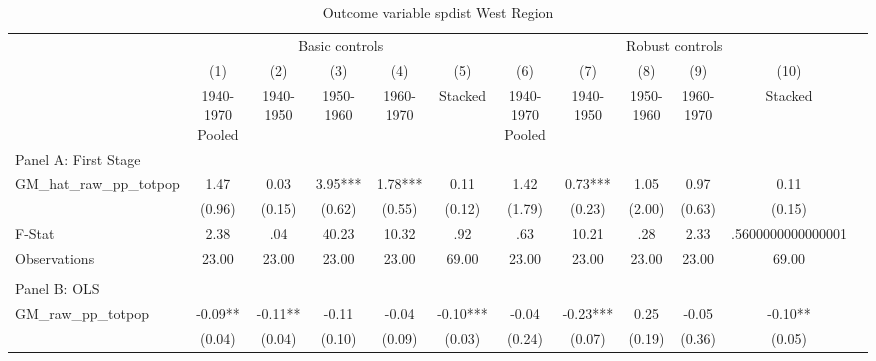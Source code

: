  \begin{table}[htbp]\centering {} \begin{threeparttable} \caption{Outcome variable spdist West Region} \begin{tabular}{l*{11}{c}} \toprule
          &\multicolumn{5}{c}{Basic controls}                                   &\multicolumn{5}{c}{Robust controls}                                  \\\cmidrule(lr){2-6}\cmidrule(lr){7-11}
          &\multicolumn{1}{c}{(1)}&\multicolumn{1}{c}{(2)}&\multicolumn{1}{c}{(3)}&\multicolumn{1}{c}{(4)}&\multicolumn{1}{c}{(5)}&\multicolumn{1}{c}{(6)}&\multicolumn{1}{c}{(7)}&\multicolumn{1}{c}{(8)}&\multicolumn{1}{c}{(9)}&\multicolumn{1}{c}{(10)}\\
          &\multicolumn{1}{c}{1940-1970 Pooled}&\multicolumn{1}{c}{1940-1950}&\multicolumn{1}{c}{1950-1960}&\multicolumn{1}{c}{1960-1970}&\multicolumn{1}{c}{Stacked}&\multicolumn{1}{c}{1940-1970 Pooled}&\multicolumn{1}{c}{1940-1950}&\multicolumn{1}{c}{1950-1960}&\multicolumn{1}{c}{1960-1970}&\multicolumn{1}{c}{Stacked}\\
\cmidrule(lr){1-11}
\multicolumn{10}{l}{Panel A: First Stage}\\
\cmidrule(lr){1-11}
GM\_hat\_raw\_pp\_totpop&      1.47   &      0.03   &      3.95***&      1.78***&      0.11   &      1.42   &      0.73***&      1.05   &      0.97   &      0.11   \\
          &    (0.96)   &    (0.15)   &    (0.62)   &    (0.55)   &    (0.12)   &    (1.79)   &    (0.23)   &    (2.00)   &    (0.63)   &    (0.15)   \\
\midrule
F-Stat    &      2.38   &       .04   &     40.23   &     10.32   &       .92   &       .63   &     10.21   &       .28   &      2.33   &.5600000000000001   \\
Observations&     23.00   &     23.00   &     23.00   &     23.00   &     69.00   &     23.00   &     23.00   &     23.00   &     23.00   &     69.00   \\
\cmidrule[\heavyrulewidth](lr){1-11} \\ \cmidrule[\heavyrulewidth](lr){1-11}
\multicolumn{10}{l}{Panel B: OLS}\\
\cmidrule(lr){1-11}
GM\_raw\_pp\_totpop&     -0.09** &     -0.11** &     -0.11   &     -0.04   &     -0.10***&     -0.04   &     -0.23***&      0.25   &     -0.05   &     -0.10** \\
          &    (0.04)   &    (0.04)   &    (0.10)   &    (0.09)   &    (0.03)   &    (0.24)   &    (0.07)   &    (0.19)   &    (0.36)   &    (0.05)   \\

\end{tabular}
\end{threeparttable}
\end{table}
